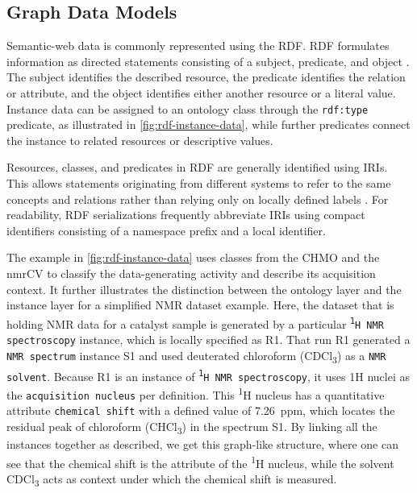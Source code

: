 \subsection{Graph Data Models}
\label{sec:graph-data-models}

Semantic-web data is commonly represented using the \acf{RDF}.
\ac{RDF} formulates information as directed statements consisting of a subject, predicate, and object \cite{w3c2014rdf11concepts}.
The subject identifies the described resource, the predicate identifies the relation or attribute, and the object identifies either another resource or a literal value.
Instance data can be assigned to an ontology class through the \texttt{rdf:type} predicate, as illustrated in \cref{fig:rdf-instance-data}, while further predicates connect the instance to related resources or descriptive values.

Resources, classes, and predicates in \ac{RDF} are generally identified using \acp{IRI}.
This allows statements originating from different systems to refer to the same concepts and relations rather than relying only on locally defined labels \cite{w3c2014rdf11concepts,huskova2025improvement}.
For readability, \ac{RDF} serializations frequently abbreviate \acp{IRI} using compact identifiers consisting of a namespace prefix and a local identifier.

The example in \cref{fig:rdf-instance-data} uses classes from the \ac{CHMO} and the \ac{nmrCV} to classify the data-generating activity and describe its acquisition context.
It further illustrates the distinction between the ontology layer and the instance layer for a simplified NMR dataset example.
Here, the dataset that is holding NMR data for a catalyst sample is generated by a particular \texttt{\textsuperscript{1}H NMR spectroscopy} instance, which is locally specified as R1.
That run R1 generated a \texttt{NMR spectrum} instance S1 and used deuterated chloroform (CDCl\textsubscript{3}) as a \texttt{NMR solvent}.
Because R1 is an instance of \texttt{\textsuperscript{1}H NMR spectroscopy}, it uses 1H nuclei as the \texttt{acquisition nucleus} per definition.
This \textsuperscript{1}H nucleus has a quantitative attribute \texttt{chemical shift} with a defined value of 7.26~ppm, which locates the residual peak of chloroform (CHCl\textsubscript{3}) in the spectrum S1.
By linking all the instances together as described, we get this graph-like structure, where one can see that the chemical shift is the attribute of the \textsuperscript{1}H nucleus, while the solvent CDCl\textsubscript{3} acts as context under which the chemical shift is measured.

